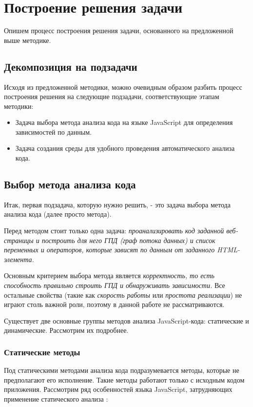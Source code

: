 
\chapter{Построение решения задачи}\label{Solution}
Опишем процесс построения решения задачи, основанного на предложенной выше методике.

\section{Декомпозиция на подзадачи}
Исходя из предложенной методики, можно очевидным образом разбить процесс построения решения на следующие подзадачи, соответствующие этапам методики:

\begin{itemize}
	\item Задача выбора метода анализа кода на языке JavaScript для определения зависимостей по данным.
	\item Задача создания среды для удобного проведения автоматического анализа кода.
\end{itemize}

\section{Выбор метода анализа кода}

Итак, первая подзадача, которую нужно решить, - это задача выбора метода анализа кода (далее просто метода). 

\bigskip
Перед методом стоит только одна задача: \textit{проанализировать код заданной веб-страницы и построить для него ГПД (граф потока данных) и список переменных и операторов, которые зависят по данным от заданного HTML-элемента.}

\bigskip
Основным критерием выбора метода является \textit{корректность, то есть способность правильно строить ГПД и обнаруживать зависимости.} Все остальные свойства (такие как \textit{скорость работы} или \textit{простота реализации}) не играют столь важной роли, поэтому в данной работе не рассматриваются.

\bigskip
Существует две основные группы методов анализа JavaScript-кода: статические и динамические. Рассмотрим их подробнее.

\subsection{Статические методы}
	Под статическими методами анализа кода подразумевается методы, которые не предполагают его исполнение. Такие методы работают только с исходным кодом приложения. Рассмотрим ряд особенностей языка JavaScript, затрудняющих применение статического анализа \cite{hardekopf}:

